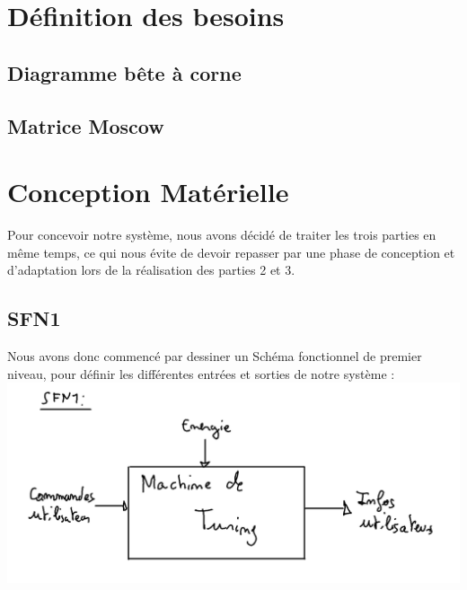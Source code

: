 \documentclass[12pt]{report}
\begin{document}
 	\section{Définition des besoins}
 	 \subsection{Diagramme bête à corne}
 	 \subsection{Matrice Moscow}
	 \section{Conception Matérielle}
	 Pour concevoir notre système, nous avons décidé de traiter les trois parties en même temps, ce qui nous évite de devoir repasser par une phase de conception et d'adaptation lors de la réalisation des parties 2 et 3.\\
	 \subsection{SFN1}
	 Nous avons donc commencé par dessiner un Schéma fonctionnel de premier niveau, pour définir les différentes entrées et sorties de notre système :\\
	 \includegraphics[width=\textwidth]{img/SFN1}
\end{document}
